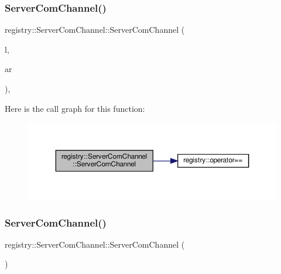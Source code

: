 \subsubsection{\texorpdfstring{Server\+Com\+Channel()}{ServerComChannel()}\hspace{0.1cm}{\footnotesize\ttfamily [1/3]}}
{\footnotesize\ttfamily registry\+::\+Server\+Com\+Channel\+::\+Server\+Com\+Channel (\begin{DoxyParamCaption}\item[{\hyperlink{structregistry_1_1RegistryLocation}{Registry\+Location} const \&}]{l,  }\item[{\hyperlink{classregistry_1_1AbstractRegistry}{Abstract\+Registry} $\ast$}]{ar }\end{DoxyParamCaption})\hspace{0.3cm}{\ttfamily [inline]}, {\ttfamily [noexcept]}}

Here is the call graph for this function\+:\nopagebreak
\begin{figure}[H]
\begin{center}
\leavevmode
\includegraphics[width=350pt]{classregistry_1_1ServerComChannel_aea787386e8aa90a93ff3e833b6f8aeb5_cgraph}
\end{center}
\end{figure}
\mbox{\label{classregistry_1_1ServerComChannel_aa60633d4a141af69715188926fc1a2f7}} 
\subsubsection{\texorpdfstring{Server\+Com\+Channel()}{ServerComChannel()}\hspace{0.1cm}{\footnotesize\ttfamily [2/3]}}
{\footnotesize\ttfamily registry\+::\+Server\+Com\+Channel\+::\+Server\+Com\+Channel (\begin{DoxyParamCaption}\item[{\hyperlink{classregistry_1_1ServerComChannel}{Server\+Com\+Channel} const \&}]{ }\end{DoxyParamCaption})\hspace{0.3cm}{\ttfamily [delete]}}

